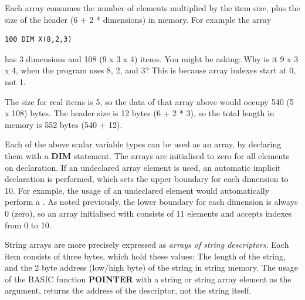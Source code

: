 Each array consumes the number of elements multiplied by the item size,
plus the size of the header (6 + 2 * dimensions) in memory.
For example the array
\begin{tcolorbox}[colback=black,coltext=white]
\verbatimfont{\codefont}
\begin{verbatim}
100 DIM X(8,2,3)
\end{verbatim}
\end{tcolorbox}
has 3 dimensions and 108 (9 x 3 x 4) items. You might be asking: Why is it 9 x 3 x 4,
when the program uses 8, 2, and 3? This is because array indexes start at 0, not 1.

The size for real items is 5, so the data of that array above would occupy 540 (5 x 108) bytes.
The header size is 12 bytes (6 + 2 * 3), so the total length in memory is 552 bytes (540 + 12).

Each of the above scalar variable types can be used as an array, by declaring
them with a {\bf DIM} statement. The arrays are initialised to zero for all
elements on declaration. If an undeclared array element is used,
an automatic implicit declaration is performed, which sets the upper boundary
for each dimension to 10. For example, the usage of an undeclared element
 would automatically perform a .
As noted previously, the lower boundary for each dimension is always 0 (zero),
so an array initialised with  consists of 11 elements and accepts indexes from
0 to 10.

String arrays are more precisely expressed as \textit{arrays of string
descriptors}. Each item consists of three bytes, which hold
these values: The length of the string, and the 2 byte address (low/high byte)
of the string in string memory.
The usage of the BASIC function {\bf POINTER} with a string or
string array element as the argument, returns the address of the descriptor, not the string itself.

